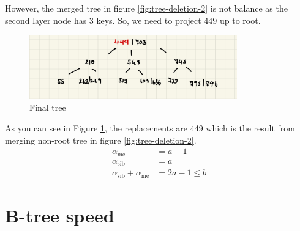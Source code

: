 \documentclass[a4paper, 12pt]{report}
\begin{document}
However, the merged tree in figure \ref{fig:tree-deletion-2} is not balance as the second layer node has 3 keys. So, we need to project 449 up to root.

\begin{figure}[h]
        \centering
        \includegraphics[width=0.8\textwidth,scale=0.5]{tree_deletion_3.jpeg}
        \caption{\label{fig:tree-deletion-3} Final tree}
\end{figure}


As you can see in Figure \ref{fig:tree-deletion-3}, the replacements are 449 which is the result from merging 
non-root tree in figure \ref{fig:tree-deletion-2}.
\begin{align*}
        \alpha_{\text{me}} &= a - 1 \\
        \alpha_{\text{sib}} &= a \\
        \alpha_{\text{sib}} + \alpha_{\text{me}} &= 2a - 1 \leq b
\end{align*} 


\chapter{B-tree speed}
\end{document}
